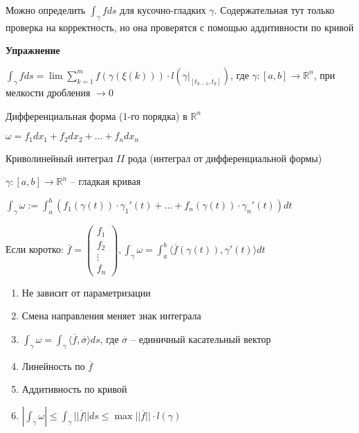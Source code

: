 \begin{remark}
    Можно определить $\int_{\gamma}^{}f ds$ для кусочно-гладких $\gamma$. Содержательная тут только проверка на корректность, но она проверятся с помощью аддитивности по кривой 
\end{remark}

\begin{theorem}\textbf{Упражнение}

    $\int_{\gamma}^{}f ds = \lim \sum_{k = 1}^{m}f(\gamma(\xi(k))) \cdot l(\gamma|_[t_{k - 1}, t_k])$, где $\gamma: [a, b] \to \mathbb{R}^n$, при мелкости дробления $\to 0$
\end{theorem}

\begin{definition}
    Дифференциальная форма (1-го порядка) в $\mathbb{R}^n$

    $\omega = f_1dx_1 + f_2dx_2 + \dots + f_ndx_n$
\end{definition}

\begin{definition}
    Криволинейный интеграл $II$ рода (интеграл от дифференциальной формы)

    $\gamma: [a, b] \to \mathbb{R}^n$ -- гладкая кривая

    $\int_{\gamma}^{}\omega := \int_{a}^{b}(f_1(\gamma(t))\cdot\gamma_1'(t) + \dots + f_n(\gamma(t))\cdot\gamma_n'(t))dt$

    Если коротко: $\overline{f} = \begin{pmatrix}
        f_1\\
        f_2\\
        \vdots\\
        f_n
    \end{pmatrix}, \int_{\gamma}^{}\omega = \int_{a}^{b}\langle \overline{f}(\gamma(t)), \gamma'(t)\rangle dt$
\end{definition}

\begin{properties}
    \begin{enumerate}
        \item Не зависит от параметризации
        \item Смена направления меняет знак интеграла
        \item $\int_{\gamma}^{}\omega = \int_{\gamma}^{}\langle \overline{f}, \overline{\sigma} \rangle ds$, где $\overline{\sigma}$ -- единичный касательный вектор
        \item Линейность по $\overline{f}$
        \item Аддитивность по кривой
        \item $|\int_{\gamma}^{}\omega| \leq \int_{\gamma}^{}||\overline{f}||ds \leq \max ||\overline{f}|| \cdot l(\gamma)$
    \end{enumerate}
\end{properties}

